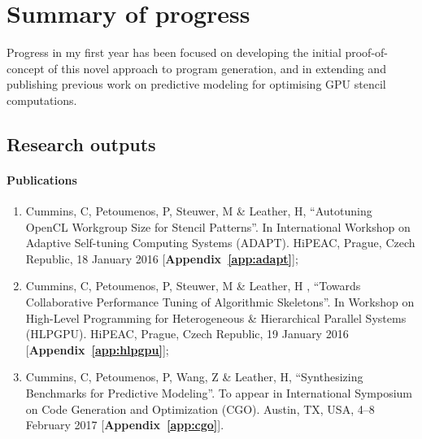 \section{Summary of progress}

Progress in my first year has been focused on developing the initial proof-of-concept of this novel approach to program generation, and in extending and publishing previous work on predictive modeling for optimising GPU stencil computations.

\newpage
\subsection{Research outputs}

\paragraph{Publications}
\begin{enumerate}
\item Cummins, C, Petoumenos, P, Steuwer, M \& Leather, H, ``Autotuning OpenCL Workgroup Size for Stencil Patterns''. In International Workshop on Adaptive Self-tuning Computing Systems (ADAPT). HiPEAC, Prague, Czech Republic, 18 January 2016 [\textbf{Appendix~\ref{app:adapt}}];
\item Cummins, C, Petoumenos, P, Steuwer, M \& Leather, H , ``Towards Collaborative Performance Tuning of Algorithmic Skeletons''. In Workshop on High-Level Programming for Heterogeneous \& Hierarchical Parallel Systems (HLPGPU). HiPEAC, Prague, Czech Republic, 19 January 2016 [\textbf{Appendix~\ref{app:hlpgpu}}];
\item Cummins, C, Petoumenos, P, Wang, Z \& Leather, H, ``Synthesizing Benchmarks for Predictive Modeling''. To appear in International Symposium on Code Generation and Optimization (CGO). Austin, TX, USA, 4--8 February 2017 [\textbf{Appendix~\ref{app:cgo}}].
\end{enumerate}

